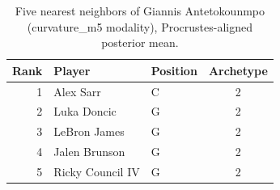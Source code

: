 \begin{table}[htbp]
  \centering\small
  \begin{tabular}{rllc}
    \toprule
    Rank & Player & Position & Archetype \\
    \midrule
    1 & Alex Sarr & C & 2 \\
    2 & Luka Doncic & G & 2 \\
    3 & LeBron James & G & 2 \\
    4 & Jalen Brunson & G & 2 \\
    5 & Ricky Council IV & G & 2 \\
    \bottomrule
  \end{tabular}
  \caption{Five nearest neighbors of Giannis Antetokounmpo (curvature_m5 modality), Procrustes-aligned posterior mean.}
  \label{tab:Giannis_Antetokounmpo_neighbors_curvature_m5}
\end{table}


